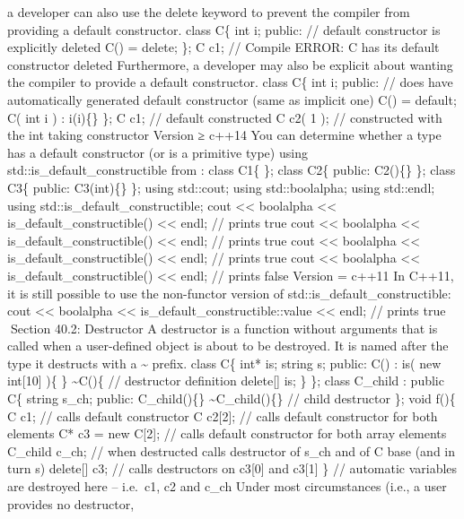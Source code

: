 a developer can also use the delete keyword to prevent the compiler from
providing a default constructor. class C\{ int i; public: // default
constructor is explicitly deleted C() = delete; \}; C c1; // Compile
ERROR: C has its default constructor deleted Furthermore, a developer
may also be explicit about wanting the compiler to provide a default
constructor. class C\{ int i; public: // does have automatically
generated default constructor (same as implicit one) C() = default; C(
int i ) : i(i)\{\} \}; C c1; // default constructed C c2( 1 ); //
constructed with the int taking constructor Version ≥ c++14 You can
determine whether a type has a default constructor (or is a primitive
type) using std::is\_default\_constructible from : class C1\{ \}; class
C2\{ public: C2()\{\} \}; class C3\{ public: C3(int)\{\} \}; using
std::cout; using std::boolalpha; using std::endl; using
std::is\_default\_constructible; cout \textless\textless{} boolalpha
\textless\textless{} is\_default\_constructible() \textless\textless{}
endl; // prints true cout \textless\textless{} boolalpha
\textless\textless{} is\_default\_constructible() \textless\textless{}
endl; // prints true cout \textless\textless{} boolalpha
\textless\textless{} is\_default\_constructible() \textless\textless{}
endl; // prints true cout \textless\textless{} boolalpha
\textless\textless{} is\_default\_constructible() \textless\textless{}
endl; // prints false Version = c++11 In C++11, it is still possible to
use the non-functor version of std::is\_default\_constructible: cout
\textless\textless{} boolalpha \textless\textless{}
is\_default\_constructible::value \textless\textless{} endl; // prints
true Section 40.2: Destructor A destructor is a function without
arguments that is called when a user-deﬁned object is about to be
destroyed. It is named after the type it destructs with a
\textasciitilde{} preﬁx. class C\{ int* is; string s; public: C() : is(
new int{[}10{]} )\{ \} \textasciitilde C()\{ // destructor definition
delete{[}{]} is; \} \}; class C\_child : public C\{ string s\_ch;
public: C\_child()\{\} \textasciitilde C\_child()\{\} // child
destructor \}; void f()\{ C c1; // calls default constructor C
c2{[}2{]}; // calls default constructor for both elements C* c3 = new
C{[}2{]}; // calls default constructor for both array elements C\_child
c\_ch; // when destructed calls destructor of s\_ch and of C base (and
in turn s) delete{[}{]} c3; // calls destructors on c3{[}0{]} and
c3{[}1{]} \} // automatic variables are destroyed here -- i.e.~c1, c2
and c\_ch Under most circumstances (i.e., a user provides no destructor,

